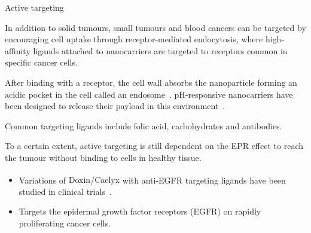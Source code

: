 \documentclass[final]{beamer}
\begin{document}
\begin{frame}[plain]
\begin{columns}[t,onlytextwidth]
\begin{block}{Active targeting\strut}
        In addition to solid tumours, small tumours and blood cancers can be targeted by encouraging cell uptake through \alert{receptor-mediated endocytosis}, where high-affinity \alert{ligands} attached to nanocarriers are \alert{targeted to receptors} common in specific cancer cells.

        After binding with a receptor, the cell wall \alert{absorbs} the nanoparticle forming an acidic pocket in the cell called an \alert{endosome}~\cite{gerweck1996cellular}. pH-responsive nanocarriers have been designed to release their payload in this environment~\cite{sun2014engineered}.

        Common targeting ligands include \alert{folic acid}, \alert{carbohydrates} and \alert{antibodies}.

        To a certain extent, active targeting is still dependent on the \alert{EPR effect} to reach the tumour without binding to cells in healthy tissue.

        \vspace{1ex}
        \begin{example}
          \begin{itemize}
            \item Variations of \alert{Doxin\textsuperscript{\textregistered}/Caelyx\textsuperscript{\textregistered}} with anti-EGFR targeting ligands have been studied in clinical trials~\cite{mamot2012tolerability}.

            \item Targets the epidermal growth factor receptors (EGFR) on rapidly proliferating cancer cells.

          \end{itemize}
        \end{example}
      \end{block}

  \end{columns}

  \vfill
  \begin{multicols}{3}
    \printbibliography
  \end{multicols}
\end{frame}
\end{document}
